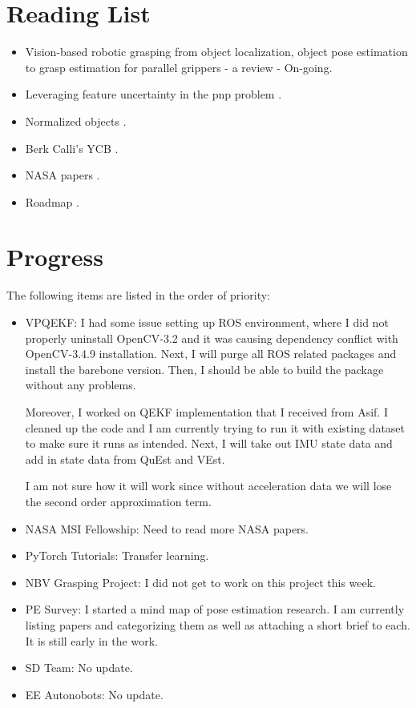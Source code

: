 \documentclass[11pt]{article}
\begin{document}
\section{Reading List}
\begin{itemize}
      \item Vision-based robotic grasping from object localization, object pose estimation to grasp estimation for parallel grippers - a review \cite{du2020vision} - On-going.
      \item Leveraging feature uncertainty in the pnp problem \cite{ferraz2014leveraging}.
      \item Normalized objects \cite{Wang_2019_CVPR}.
      \item Berk Calli's YCB \cite{calli2015ycb}.
      \item NASA papers \cite{NASATech44:online}.
      \item Roadmap \cite{roadmap251:online}.
\end{itemize}

\section{Progress}
The following items are listed in the order of priority:
\begin{itemize}
      \item VPQEKF: I had some issue setting up ROS environment, where I did not properly uninstall OpenCV-3.2 and it was causing dependency conflict with OpenCV-3.4.9 installation. Next, I will purge all ROS related packages and install the barebone version.
      Then, I should be able to build the package without any problems.

      Moreover, I worked on QEKF implementation that I received from Asif. I cleaned up the code and I am currently trying to run it with existing dataset to make sure it runs as intended. Next, I will take out IMU state data and add in state data from QuEst and VEst.

      I am not sure how it will work since without acceleration data we will lose the second order approximation term.

      \item NASA MSI Fellowship: Need to read more NASA papers.
      \item PyTorch Tutorials: Transfer learning.
      \item NBV Grasping Project: I did not get to work on this project this week.
      \item PE Survey: I started a mind map of pose estimation research. I am currently listing papers and categorizing them as well as attaching a short brief to each. It is still early in the work.

      \item SD Team: No update.
      \item EE Autonobots: No update.
\end{itemize}
\end{document}
